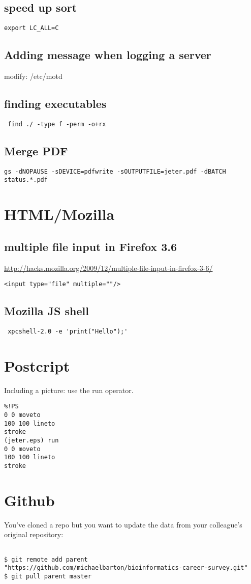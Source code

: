 \documentclass[12pt]{article}
\begin{document}
\subsection{speed up sort}
\begin{verbatim}
export LC_ALL=C
\end{verbatim}

\subsection{Adding message when logging a server}
modify: /etc/motd
\subsection{finding executables}
\begin{verbatim}
 find ./ -type f -perm -o+rx
\end{verbatim}

\subsection{Merge PDF}
\begin{verbatim}
gs -dNOPAUSE -sDEVICE=pdfwrite -sOUTPUTFILE=jeter.pdf -dBATCH status.*.pdf
\end{verbatim}

\section{HTML/Mozilla}
\subsection{multiple file input in Firefox 3.6}
\url{http://hacks.mozilla.org/2009/12/multiple-file-input-in-firefox-3-6/}
\begin{verbatim}
<input type="file" multiple=""/>
\end{verbatim}
\subsection{Mozilla JS shell}
\begin{verbatim}
 xpcshell-2.0 -e 'print("Hello");'
\end{verbatim}
\section{Postcript}
Including a picture: use the run operator.
\begin{verbatim}
%!PS
0 0 moveto
100 100 lineto
stroke
(jeter.eps) run
0 0 moveto
100 100 lineto
stroke
\end{verbatim}
\section{Github}
You've cloned a repo but you want to update the data from your colleague's original repository:
\begin{verbatim}

$ git remote add parent "https://github.com/michaelbarton/bioinformatics-career-survey.git"
$ git pull parent master
\end{verbatim}
\end{document}
